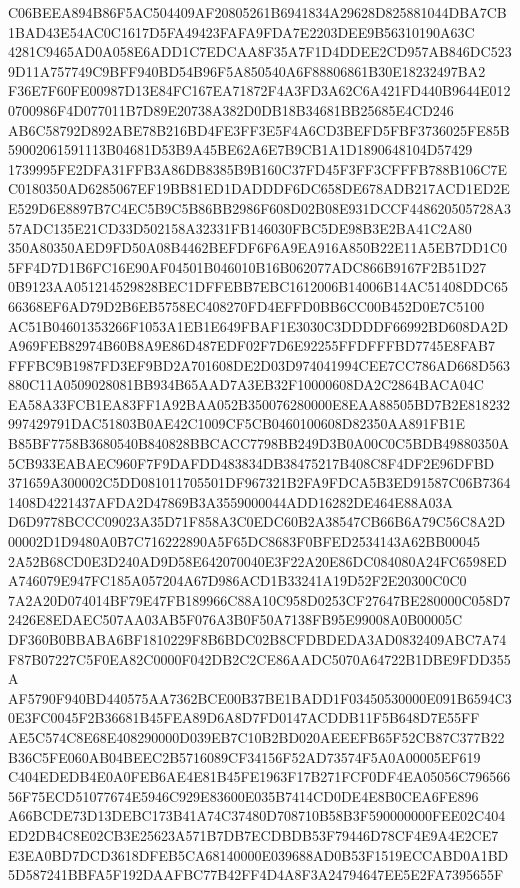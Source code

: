 \documentclass[UTF8,fontset=fandol,zihao=-4,a4paper]{ctexart}
\begin{document}
{{C06BEEA894B86F5AC504409AF20805261B6941834A29628D825881044DBA7CB1BAD43E54AC0C1617D5FA49423FAFA9FDA7E2203DEE9B56310190A63C
4281C9465AD0A058E6ADD1C7EDCAA8F35A7F1D4DDEE2CD957AB846DC5239D11A757749C9BFF940BD54B96F5A850540A6F88806861B30E18232497BA2
F36E7F60FE00987D13E84FC167EA71872F4A3FD3A62C6A421FD440B9644E0120700986F4D077011B7D89E20738A382D0DB18B34681BB25685E4CD246
AB6C58792D892ABE78B216BD4FE3FF3E5F4A6CD3BEFD5FBF3736025FE85B59002061591113B04681D53B9A45BE62A6E7B9CB1A1D1890648104D57429
1739995FE2DFA31FFB3A86DB8385B9B160C37FD45F3FF3CFFFB788B106C7EC0180350AD6285067EF19BB81ED1DADDDF6DC658DE678ADB217ACD1ED2E
E529D6E8897B7C4EC5B9C5B86BB2986F608D02B08E931DCCF448620505728A357ADC135E21CD33D502158A32331FB146030FBC5DE98B3E2BA41C2A80
350A80350AED9FD50A08B4462BEFDF6F6A9EA916A850B22E11A5EB7DD1C05FF4D7D1B6FC16E90AF04501B046010B16B062077ADC866B9167F2B51D27
0B9123AA051214529828BEC1DFFEBB7EBC1612006B14006B14AC51408DDC6566368EF6AD79D2B6EB5758EC408270FD4EFFD0BB6CC00B452D0E7C5100
AC51B04601353266F1053A1EB1E649FBAF1E3030C3DDDDF66992BD608DA2DA969FEB82974B60B8A9E86D487EDF02F7D6E92255FFDFFFBD7745E8FAB7
FFFBC9B1987FD3EF9BD2A701608DE2D03D974041994CEE7CC786AD668D563880C11A0509028081BB934B65AAD7A3EB32F10000608DA2C2864BACA04C
EA58A33FCB1EA83FF1A92BAA052B350076280000E8EAA88505BD7B2E818232997429791DAC51803B0AE42C1009CF5CB0460100608D82350AA891FB1E
B85BF7758B3680540B840828BBCACC7798BB249D3B0A00C0C5BDB49880350A5CB933EABAEC960F7F9DAFDD483834DB38475217B408C8F4DF2E96DFBD
371659A300002C5DD081011705501DF967321B2FA9FDCA5B3ED91587C06B73641408D4221437AFDA2D47869B3A3559000044ADD16282DE464E88A03A
D6D9778BCCC09023A35D71F858A3C0EDC60B2A38547CB66B6A79C56C8A2D00002D1D9480A0B7C716222890A5F65DC8683F0BFED2534143A62BB00045
2A52B68CD0E3D240AD9D58E642070040E3F22A20E86DC084080A24FC6598EDA746079E947FC185A057204A67D986ACD1B33241A19D52F2E20300C0C0
7A2A20D074014BF79E47FB189966C88A10C958D0253CF27647BE280000C058D72426E8EDAEC507AA03AB5F076A3B0F50A7138FB95E99008A0B00005C
DF360B0BBABA6BF1810229F8B6BDC02B8CFDBDEDA3AD0832409ABC7A74F87B07227C5F0EA82C0000F042DB2C2CE86AADC5070A64722B1DBE9FDD355A
AF5790F940BD440575AA7362BCE00B37BE1BADD1F03450530000E091B6594C30E3FC0045F2B36681B45FEA89D6A8D7FD0147ACDDB11F5B648D7E55FF
AE5C574C8E68E408290000D039EB7C10B2BD020AEEEFB65F52CB87C377B22B36C5FE060AB04BEEC2B5716089CF34156F52AD73574F5A0A00005EF619
C404EDEDB4E0A0FEB6AE4E81B45FE1963F17B271FCF0DF4EA05056C79656656F75ECD51077674E5946C929E83600E035B7414CD0DE4E8B0CEA6FE896
A66BCDE73D13DEBC173B41A74C37480D708710B58B3F590000000FEE02C404ED2DB4C8E02CB3E25623A571B7DB7ECDBDB53F79446D78CF4E9A4E2CE7
E3EA0BD7DCD3618DFEB5CA68140000E039688AD0B53F1519ECCABD0A1BD5D587241BBFA5F192DAAFBC77B42FF4D4A8F3A24794647EE5E2FA7395655F
}}
\end{document}
